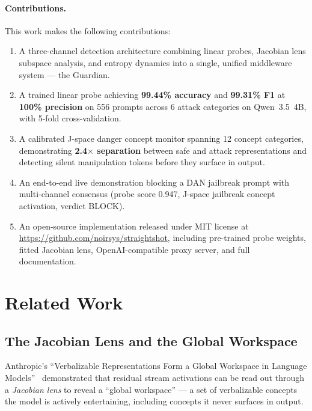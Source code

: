 \documentclass[11pt]{article}
\begin{document}
\paragraph{Contributions.}
This work makes the following contributions:
\begin{enumerate}[nosep]
    \item A three-channel detection architecture combining linear probes, Jacobian lens subspace analysis, and entropy dynamics into a single, unified middleware system — the Guardian.
    \item A trained linear probe achieving \textbf{99.44\% accuracy} and \textbf{99.31\% F1} at \textbf{100\% precision} on 556 prompts across 6 attack categories on Qwen~3.5~4B, with 5-fold cross-validation.
    \item A calibrated J-space danger concept monitor spanning 12 concept categories, demonstrating \textbf{2.4$\times$ separation} between safe and attack representations and detecting silent manipulation tokens before they surface in output.
    \item An end-to-end live demonstration blocking a DAN jailbreak prompt with multi-channel consensus (probe score 0.947, J-space jailbreak concept activation, verdict BLOCK).
    \item An open-source implementation released under MIT license at \url{https://github.com/noirsys/straightshot}, including pre-trained probe weights, fitted Jacobian lens, OpenAI-compatible proxy server, and full documentation.
\end{enumerate}

\section{Related Work}
\label{sec:related}

\subsection{The Jacobian Lens and the Global Workspace}

Anthropic's ``Verbalizable Representations Form a Global Workspace in Language Models''~\cite{anthropic2026workspace} demonstrated that residual stream activations can be read out through a \emph{Jacobian lens} to reveal a ``global workspace'' — a set of verbalizable concepts the model is actively entertaining, including concepts it never surfaces in output.
\end{document}
